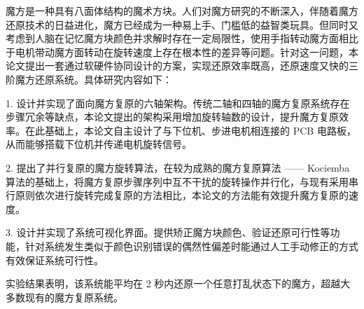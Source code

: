 \begin{abstractc}
	魔方是一种具有八面体结构的魔术方块。人们对魔方研究的不断深入，伴随着魔方还原技术的日益进化，魔方已经成为一种易上手、门槛低的益智类玩具。但同时又考虑到人脑在记忆魔方块颜色并求解时存在一定局限性，使用手指转动魔方面相比于电机带动魔方面转动在旋转速度上存在根本性的差异等问题。针对这一问题，本论文提出一套通过软硬件协同设计的方案，实现还原效率既高，还原速度又快的三阶魔方还原系统。具体研究内容如下：
	
	1. 设计并实现了面向魔方复原的六轴架构。传统二轴和四轴的魔方复原系统存在步骤冗余等缺点，本论文提出的架构采用增加旋转轴数的设计，提升魔方复原效率。在此基础上，本论文自主设计了与下位机、步进电机相连接的 PCB 电路板，从而能够搭载下位机并传递电机旋转信号。
	
	2. 提出了并行复原的魔方旋转算法，在较为成熟的魔方复原算法 —— Kociemba 算法的基础上，将魔方复原步骤序列中互不干扰的旋转操作并行化，与现有采用串行原则依次进行旋转完成复原的方法相比，本论文的方法能有效提升魔方复原的速度。
	
	3. 设计并实现了系统可视化界面。提供矫正魔方块颜色、验证还原可行性等功能，针对系统发生类似于颜色识别错误的偶然性偏差时能通过人工手动修正的方式有效保证系统可行性。
	
	实验结果表明，该系统能平均在 2 秒内还原一个任意打乱状态下的魔方，超越大多数现有的魔方复原系统。
	
\end{abstractc}
